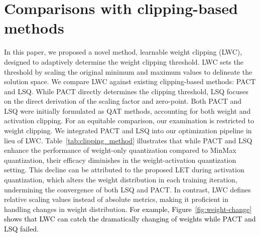 \documentclass{article} %
\begin{document}
\section{Comparisons with clipping-based methods}\label{sec:comparisons-with-clipping}
In this paper, we proposed a novel method, learnable weight clipping (LWC), designed to adaptively determine the weight clipping threshold. LWC sets the threshold by scaling the original minimum and maximum values to delineate the solution space. We compare LWC against existing clipping-based methods: PACT and LSQ. While PACT directly determines the clipping threshold, LSQ focuses on the direct derivation of the scaling factor and zero-point. Both PACT and LSQ were initially formulated as QAT methods, accounting for both weight and activation clipping. For an equitable comparison, our examination is restricted to weight clipping. We integrated PACT and LSQ into our optimization pipeline in lieu of LWC.
%
Table~\ref{tab:clipping_method} illustrates that while PACT and LSQ enhance the performance of weight-only quantization compared to MinMax quantization, their efficacy diminishes in the weight-activation quantization setting. This decline can be attributed to the proposed LET during activation quantization, which alters the weight distribution in each training iteration, undermining the convergence of both LSQ and PACT. In contrast, LWC defines relative scaling values instead of absolute metrics, making it proficient in handling changes in weight distribution. 
%
\textcolor{black}{For example, Figure~\ref{fig:weight-change} shows that LWC can catch the dramatically changing of weights while PACT and LSQ failed.}

%
\end{document}

